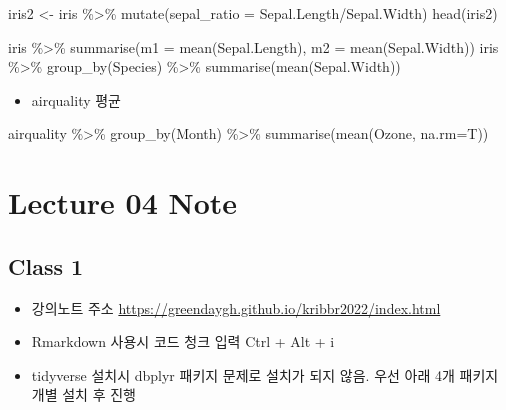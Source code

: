 \documentclass[
]{book}
\newenvironment{Shaded}{\begin{snugshade}}{\end{snugshade}}
\newcommand{\AttributeTok}[1]{\textcolor[rgb]{0.77,0.63,0.00}{#1}}
\newcommand{\FunctionTok}[1]{\textcolor[rgb]{0.00,0.00,0.00}{#1}}
\newcommand{\NormalTok}[1]{#1}
\newcommand{\OtherTok}[1]{\textcolor[rgb]{0.56,0.35,0.01}{#1}}
\newcommand{\SpecialCharTok}[1]{\textcolor[rgb]{0.00,0.00,0.00}{#1}}
\providecommand{\tightlist}{%
  \setlength{\itemsep}{0pt}\setlength{\parskip}{0pt}}
\begin{document}
\begin{Shaded}
\begin{Highlighting}[]
\NormalTok{iris2 }\OtherTok{\textless{}{-}}\NormalTok{ iris }\SpecialCharTok{\%\textgreater{}\%} \FunctionTok{mutate}\NormalTok{(}\AttributeTok{sepal\_ratio =}\NormalTok{ Sepal.Length}\SpecialCharTok{/}\NormalTok{Sepal.Width)}
\FunctionTok{head}\NormalTok{(iris2)}



\NormalTok{iris }\SpecialCharTok{\%\textgreater{}\%} \FunctionTok{summarise}\NormalTok{(}\AttributeTok{m1 =} \FunctionTok{mean}\NormalTok{(Sepal.Length), }\AttributeTok{m2 =} \FunctionTok{mean}\NormalTok{(Sepal.Width))}
\NormalTok{iris }\SpecialCharTok{\%\textgreater{}\%} 
  \FunctionTok{group\_by}\NormalTok{(Species) }\SpecialCharTok{\%\textgreater{}\%} 
  \FunctionTok{summarise}\NormalTok{(}\FunctionTok{mean}\NormalTok{(Sepal.Width))}
\end{Highlighting}
\end{Shaded}

\begin{itemize}
\tightlist
\item
  airquality 평균
\end{itemize}

\begin{Shaded}
\begin{Highlighting}[]

\NormalTok{airquality }\SpecialCharTok{\%\textgreater{}\%} 
  \FunctionTok{group\_by}\NormalTok{(Month) }\SpecialCharTok{\%\textgreater{}\%} 
  \FunctionTok{summarise}\NormalTok{(}\FunctionTok{mean}\NormalTok{(Ozone, }\AttributeTok{na.rm=}\NormalTok{T))}
\end{Highlighting}
\end{Shaded}

\hypertarget{lecture-04-note}{%
\chapter{Lecture 04 Note}\label{lecture-04-note}}

\hypertarget{class-1-1}{%
\section{Class 1}\label{class-1-1}}

\begin{itemize}
\tightlist
\item
  강의노트 주소 \url{https://greendaygh.github.io/kribbr2022/index.html}
\item
  Rmarkdown 사용시 코드 청크 입력 Ctrl + Alt + i
\item
  tidyverse 설치시 dbplyr 패키지 문제로 설치가 되지 않음. 우선 아래 4개 패키지 개별 설치 후 진행
\end{itemize}
\end{document}
